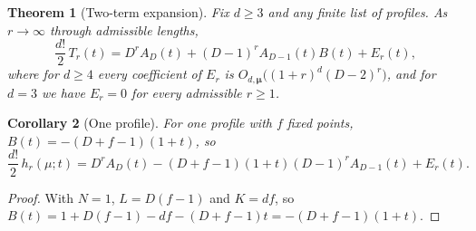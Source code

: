 \documentclass[11pt,a4paper]{article}
\newtheorem{theorem}{Theorem}[section]
\newtheorem{corollary}[theorem]{Corollary}
\theoremstyle{definition}\newtheorem{definition}[theorem]{Definition}
\theoremstyle{remark}\newtheorem{remark}[theorem]{Remark}\newtheorem{example}[theorem]{Example}
\numberwithin{equation}{section}
\begin{document}
\begin{theorem}[Two-term expansion]\label{th:two}
Fix $d\ge3$ and any finite list of profiles. As $r\to\infty$ through admissible lengths,
\begin{equation}\label{eq:general}
 \frac{d!}{2}\,T_r(t)=D^rA_D(t)+(D-1)^rA_{D-1}(t)B(t)+E_r(t),
\end{equation}
where for $d\ge4$ every coefficient of $E_r$ is $O_{d,\boldsymbol\mu}\bigl((1+r)^{d}(D-2)^r\bigr)$, and for $d=3$ we have $E_r=0$ for every admissible $r\ge1$.
\end{theorem}

\begin{corollary}[One profile]\label{cor:single}
For one profile with $f$ fixed points, $B(t)=-(D+f-1)(1+t)$, so
\begin{equation}\label{eq:single}
 \frac{d!}{2}\,h_r(\mu;t)=D^rA_D(t)-(D+f-1)(1+t)(D-1)^rA_{D-1}(t)+E_r(t).
\end{equation}
\end{corollary}
\begin{proof}
With $N=1$, $L=D(f-1)$ and $K=df$, so $B(t)=1+D(f-1)-df-(D+f-1)t=-(D+f-1)(1+t)$.
\end{proof}
\end{document}

